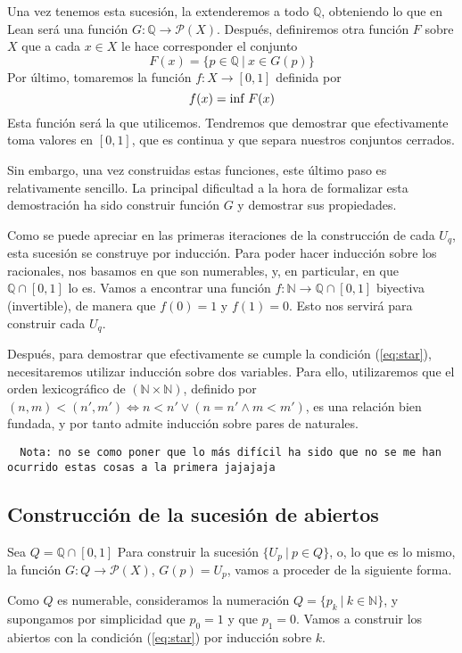 Una vez tenemos esta sucesión, la extenderemos a todo $\mathbb{Q}$, obteniendo lo que en Lean será una función $G : \mathbb{Q} \to \mathcal{P}(X)$. Después, definiremos otra función $F$ sobre $X$ que a cada $x \in X$ le hace corresponder el conjunto
$$
F(x) = \{p \in \mathbb{Q} ~|~ x \in G(p)\}
$$
Por último, tomaremos la función $f : X \to [0, 1]$ definida por
$$
f(x) = \textnormal{inf}~F(x)
$$
Esta función será la que utilicemos. Tendremos que demostrar que efectivamente toma valores en $[0, 1]$, que es continua y que separa nuestros conjuntos cerrados.

Sin embargo, una vez construidas estas funciones, este último paso es relativamente sencillo. La principal dificultad a la hora de formalizar esta demostración ha sido construir función $G$ y demostrar sus propiedades.

Como se puede apreciar en las primeras iteraciones de la construcción de cada $U_q$, esta sucesión se construye por inducción. Para poder hacer inducción sobre los racionales, nos basamos en que son numerables, y, en particular, en que $\mathbb{Q}\cap[0, 1]$ lo es. Vamos a encontrar una función $f : \mathbb{N} \to \mathbb{Q} \cap [0, 1]$ biyectiva (invertible), de manera que $f(0) = 1$ y $f(1) = 0$. Esto nos servirá para construir cada $U_q$.

Después, para demostrar que efectivamente se cumple la condición (\ref{eq:star}), necesitaremos utilizar inducción sobre dos variables. Para ello, utilizaremos que el orden lexicográfico de $(\mathbb{N} \times \mathbb{N})$, definido por $(n, m) < (n', m') \iff n<n' \lor (n=n' \land m<m')$, es una relación bien fundada, y por tanto admite inducción sobre pares de naturales.

\begin{lstlisting}
  Nota: no se como poner que lo más difícil ha sido que no se me han ocurrido estas cosas a la primera jajajaja
\end{lstlisting}

\subsection{Construcción de la sucesión de abiertos}

Sea $Q = \mathbb{Q}\cap[0, 1]$ Para construir la sucesión $\{U_p ~|~ p \in Q\}$, o, lo que es lo mismo, la función $G : Q \to \mathcal{P}(X)$, $G(p) = U_p$, vamos a proceder de la siguiente forma.

Como $Q$ es numerable, consideramos la numeración $Q = \{p_k ~|~ k \in \mathbb{N}\}$, y supongamos por simplicidad que $p_0 = 1$ y que $p_1 = 0$. Vamos a construir los abiertos con la condición (\ref{eq:star}) por inducción sobre $k$.

